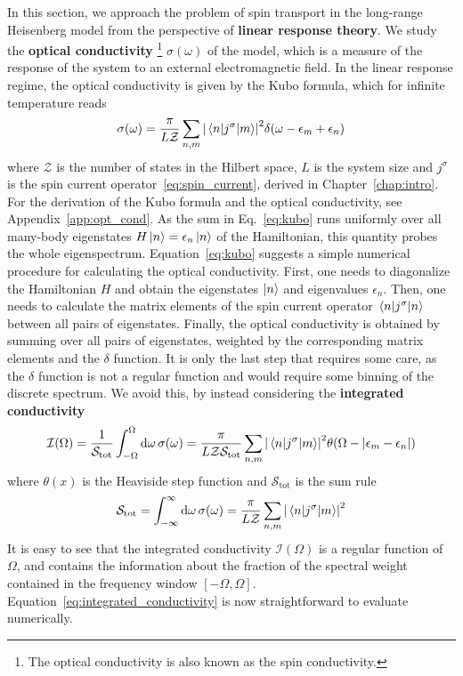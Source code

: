 In this section, we approach the problem of spin transport in the long-range Heisenberg model from the
perspective of \textbf{linear response theory}. We study the \textbf{optical conductivity}
\footnote{The optical conductivity is also known as the spin conductivity.} \(\sigma(\omega)\) of the model,
which is a measure of the response of the system to an external electromagnetic field.
In the linear response regime, the optical conductivity is given by the Kubo formula, which
for infinite temperature reads
\begin{equation}
  \sigma(\omega) = \frac{\pi}{L \mathcal{Z}} \sum_{n,m} \abs{\mel{n}{j^{\sigma}}{m}}^2 \delta(\omega - \epsilon_m + \epsilon_n)
  \label{eq:kubo}
\end{equation}
where \(\mathcal{Z}\) is the number of states in the Hilbert space, \(L\) is the system size and \(j^{\sigma}\) is the spin
current operator~\eqref{eq:spin_current}, derived in Chapter~\ref{chap:intro}.
For the derivation of the Kubo formula and the optical conductivity, see Appendix~\ref{app:opt_cond}.
As the sum in Eq.~\eqref{eq:kubo} runs
uniformly over all many-body eigenstates \(H \ket{n} = \epsilon_n \ket{n}\) of the Hamiltonian, this quantity
probes the whole eigenspectrum. Equation~\ref {eq:kubo} suggests a simple numerical procedure for calculating
the optical conductivity. First, one needs to diagonalize the Hamiltonian \(H\) and obtain the eigenstates
\(\ket{n}\) and eigenvalues \(\epsilon_n\). Then, one needs to calculate the matrix elements of the spin current operator
\(\mel{n}{j^{\sigma}}{n}\) between all pairs of eigenstates. Finally, the optical conductivity is obtained by
summing over all pairs of eigenstates, weighted by the corresponding matrix elements and the \(\delta\) function.
It is only the last step that requires some care, as the \(\delta\) function is not a regular function and
would require some binning of the discrete spectrum. We avoid this, by instead considering the
\textbf{integrated conductivity}
\begin{equation}
  \mathcal{I}(\Omega) = \frac{1}{\mathcal{S}_{\mathrm{tot}}} \int_{-\Omega}^{\Omega} \dd{\omega} \sigma(\omega) =
  \frac{\pi}{L \mathcal{Z} \mathcal{S}_{\mathrm{tot}}} \sum_{n,m} \abs{\mel{n}{j^{\sigma}}{m}}^2 \theta(\Omega- \abs{\epsilon_m - \epsilon_n})
  \label{eq:integrated_conductivity}
\end{equation}
where \(\theta(x)\) is the Heaviside step function and  \(\mathcal{S}_{\mathrm{tot}}\) is the sum rule
\begin{equation}
  \mathcal{S}_{\mathrm{tot}} = \int_{-\infty}^{\infty} \dd{\omega} \sigma(\omega) = \frac{\pi}{L \mathcal{Z}} \sum_{n,m} \abs{\mel{n}{j^{\sigma}}{m}}^2
\end{equation}
It is easy to see that the integrated conductivity \(\mathcal{I}(\Omega)\) is a regular function of \(\Omega\), and
contains the information about the fraction of the spectral weight contained in the frequency window
\(\left[-\Omega,\Omega\right]\).
Equation~\eqref{eq:integrated_conductivity} is now straightforward to evaluate numerically.


